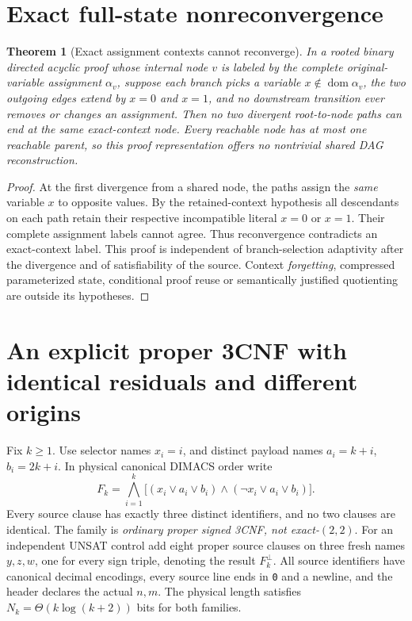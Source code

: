 \documentclass[11pt]{article}
\newtheorem{theorem}{Theorem}
\begin{document}
\section{Exact full-state nonreconvergence}
\begin{theorem}[Exact assignment contexts cannot reconverge]\label{th:full}
In a rooted binary directed acyclic proof whose internal node \(v\) is labeled by the \emph{complete} original-variable assignment \(\alpha_v\), suppose each branch picks a variable \(x\notin\operatorname{dom}\alpha_v\), the two outgoing edges extend by \(x=0\) and \(x=1\), and no downstream transition ever removes or changes an assignment. Then no two divergent root-to-node paths can end at the same exact-context node. Every reachable node has at most one reachable parent, so this proof representation offers no nontrivial shared DAG reconstruction.
\end{theorem}
\begin{proof}
At the first divergence from a shared node, the paths assign the \emph{same} variable \(x\) to opposite values. By the retained-context hypothesis all descendants on each path retain their respective incompatible literal \(x=0\) or \(x=1\). Their complete assignment labels cannot agree. Thus reconvergence contradicts an exact-context label. This proof is independent of branch-selection adaptivity after the divergence and of satisfiability of the source. Context \emph{forgetting}, compressed parameterized state, conditional proof reuse or semantically justified quotienting are outside its hypotheses.
\end{proof}

\section{An explicit proper 3CNF with identical residuals and different origins}
Fix \(k\ge1\). Use selector names \(x_i=i\), and distinct payload names \(a_i=k+i\), \(b_i=2k+i\). In physical canonical DIMACS order write
\[
F_k=\bigwedge_{i=1}^{k}\bigl[(x_i\vee a_i\vee b_i)\wedge(\neg x_i\vee a_i\vee b_i)\bigr].\tag{1}
\]
Every source clause has exactly three distinct identifiers, and no two clauses are identical. The family is \emph{ordinary proper signed 3CNF, not exact-$(2,2)$}. For an independent UNSAT control add eight proper source clauses on three fresh names \(y,z,w\), one for every sign triple, denoting the result \(F_k^{\bot}\). All source identifiers have canonical decimal encodings, every source line ends in \texttt{0} and a newline, and the header declares the actual \(n,m\). The physical length satisfies \(N_k=\Theta(k\log(k+2))\) bits for both families.
\end{document}
